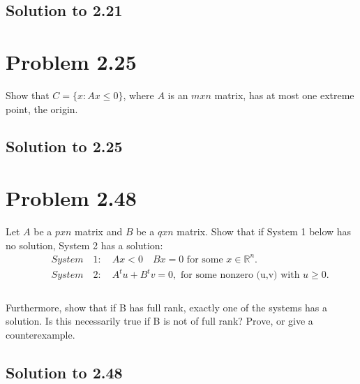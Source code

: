 \documentclass[12pt]{article}
\begin{document}
\subsection{Solution to 2.21}

\section{Problem 2.25}
Show that $C=\{x: Ax \leq 0\}$, where $A$ is an $m x n$ matrix, has at most one extreme point, the origin.\\
\subsection{Solution to 2.25}

\section{Problem 2.48}
Let $A$ be a $p x n$ matrix and $B$ be a $q x n$ matrix. Show that if System 1 below has no solution, System 2 has a solution:\\
    \begin{align*}
        &\quad System \quad 1: \quad Ax < 0 \quad Bx =0 \text{ for some } x \in \mathbb{R}^n.\\
        &\quad System \quad 2: \quad A^tu + B^tv  = 0 ,\text{ for some  nonzero (u,v) with } u \geq 0.\\
    \end{align*} \\
Furthermore, show that if B has full rank, exactly one of the systems has a solution. Is this necessarily true if B is not of full rank? Prove, or give a counterexample.\\ 

\subsection{Solution to 2.48}
\end{document}
